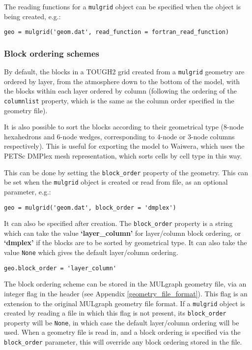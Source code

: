 The reading functions for a \texttt{mulgrid} object can be specified when the object is being created, e.g.:

\begin{lstlisting}
geo = mulgrid('geom.dat', read_function = fortran_read_function)
\end{lstlisting}

\subsubsection{Block ordering schemes}
\label{sec:mulgrid:blockordering}

By default, the blocks in a TOUGH2 grid created from a \texttt{mulgrid} geometry are ordered
by layer, from the atmosphere down to the bottom of the model, with the blocks within
each layer ordered by column (following the ordering of the \texttt{columnlist} property, which
is the same as the column order specified in the geometry file).

It is also possible to sort the blocks according to their geometrical type (8-node hexahedrons
and 6-node wedges, corresponding to 4-node or 3-node columns respectively). This is useful for
exporting the model to Waiwera, which uses the PETSc DMPlex mesh representation, which sorts
cells by cell type in this way.

This can be done by setting the \texttt{block\_order} property of the geometry. This can be set
when the \texttt{mulgrid} object is created or read from file, as an optional parameter, e.g.:

\begin{lstlisting}
geo = mulgrid('geom.dat', block_order = 'dmplex')
\end{lstlisting}

It can also be specified after creation. The \texttt{block\_order} property is a string which can
take the value \textbf{`layer\_column'} for layer/column block ordering, or \textbf{`dmplex'}
if the blocks are to be sorted by geometrical type. It can also take the value \texttt{None}
which gives the default layer/column ordering.

\begin{lstlisting}
geo.block_order = 'layer_column'
\end{lstlisting}

The block ordering scheme can be stored in the MULgraph geometry file, via an integer flag in
the header (see Appendix \ref{geometry_file_format}). This flag is an extension to the original
MULgraph geometry file format. If a \texttt{mulgrid} object is created by reading a file in
which this flag is not present, its \texttt{block\_order} property will be \texttt{None}, in
which case the default layer/column ordering will be used. When a geometry file is read in,
and a block ordering is specified via the \texttt{block\_order} parameter, this will override
any block ordering stored in the file.

